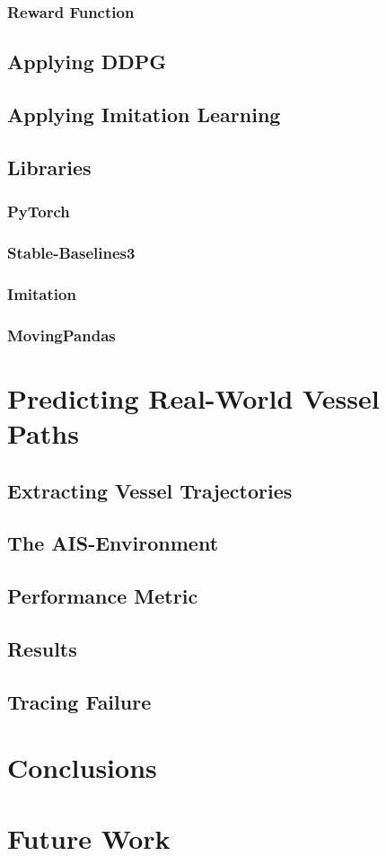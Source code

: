         \subsubsection{Reward Function}
        
        
    \subsection{Applying DDPG}
    \subsection{Applying Imitation Learning}
    \subsection{Libraries}
        \subsubsection{PyTorch}
        \subsubsection{Stable-Baselines3}
        \subsubsection{Imitation}
        \subsubsection{MovingPandas}
    
\newpage
\section{Predicting Real-World Vessel Paths}\label{chap:realworld}
    \subsection{Extracting Vessel Trajectories}
    \subsection{The AIS-Environment}
    \subsection{Performance Metric}
    \subsection{Results}
    \subsection{Tracing Failure}
 
\newpage   
\section{Conclusions}
\newpage
\section{Future Work}

